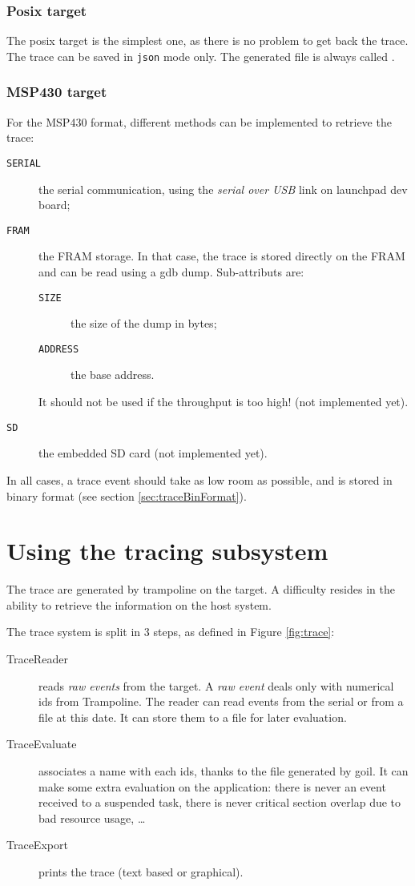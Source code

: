\subsubsection{Posix target}
The posix target is the simplest one, as there is no problem to get back the trace. The trace can be saved in \texttt{json} mode only. The generated file is always called .

\subsubsection{MSP430 target}
For the MSP430 format, different methods can be implemented to retrieve the trace:
\begin{description}
	\item[\texttt{SERIAL}] the serial communication, using the \emph{serial over USB} link on launchpad dev board;
	\item[\texttt{FRAM}] the FRAM storage. In that case, the trace is stored directly on the FRAM and can be read using a gdb dump. Sub-attributs are:
\begin{description}
	\item[\texttt{SIZE}] the size of the dump in bytes;
	\item[\texttt{ADDRESS}] the base address.
\end{description} It should not be used if the throughput is too high!
(not implemented yet).

	\item[\texttt{SD}] the embedded SD card (not implemented yet).
\end{description}

In all cases, a trace event should take as low room as possible, and is stored in binary format (see section \ref{sec:traceBinFormat}).



\section{Using the tracing subsystem}

The trace are generated by trampoline on the target. A difficulty resides in the ability to retrieve the information on the host system. 

The trace system is split in 3 steps, as defined in Figure \ref{fig:trace}:
\begin{description}
	\item[TraceReader] reads \textsl{raw events} from the target. A \textsl{raw event} deals only with numerical ids from Trampoline. The reader can read events from the serial or from a file at this date. It can store them to a file for later evaluation.
	\item[TraceEvaluate] associates a name with each ids, thanks to the  file generated by goil. It can make some extra evaluation on the application: there is never an event received to a suspended task, there is never critical section overlap due to bad resource usage, …
	\item[TraceExport] prints the trace (text based or graphical).
\end{description}


